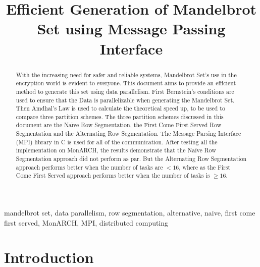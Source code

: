 \documentclass[conference]{IEEEtran}
\begin{document}
	
	\title{Efficient Generation of Mandelbrot Set using Message Passing Interface}
	
	\author{
	}
		
	\maketitle
	
	\begin{abstract}
		With the increasing need for safer and reliable systems, Mandelbrot Set's use in the encryption world is evident to everyone. This document aims to provide an efficient method to generate this set using data parallelism. First Bernstein's conditions \cite{bernstein1996analysis} are used to ensure that the Data is parallelizable when generating the Mandelbrot Set. Then Amdhal's Law is used \cite{amdahl1967validity} to calculate the theoretical speed up, to be used to compare three partition schemes. The three partition schemes discussed in this document are the Naïve Row Segmentation, the First Come First Served Row Segmentation and the Alternating Row Segmentation. The Message Parsing Interface (MPI) library in C \cite{openmpi} is used for all of the communication. After testing all the implementation on MonARCH, the results demonstrate that the Naïve Row Segmentation approach did not perform as par. But the Alternating Row Segmentation approach performs better when the number of tasks are $< 16$, where as the First Come First Served approach performs better when the number of tasks is $\ge 16$. 
	\end{abstract}

	
	\begin{IEEEkeywords}
		mandelbrot set, data parallelism, row segmentation, alternative, naive, first come first served, MonARCH, MPI, distributed computing
	\end{IEEEkeywords}
	
	\section{Introduction}
\end{document}
